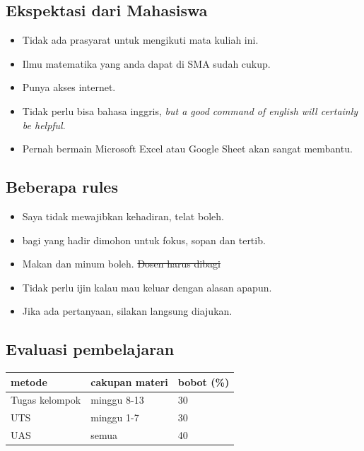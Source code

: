 \documentclass[
  letterpaper,
  DIV=11,
  numbers=noendperiod]{scrartcl}
\providecommand{\tightlist}{%
  \setlength{\itemsep}{0pt}\setlength{\parskip}{0pt}}\usepackage{longtable,booktabs,array}
\begin{document}
\hypertarget{ekspektasi-dari-mahasiswa}{%
\subsection{Ekspektasi dari Mahasiswa}\label{ekspektasi-dari-mahasiswa}}

\begin{itemize}
\tightlist
\item
  Tidak ada prasyarat untuk mengikuti mata kuliah ini.
\item
  Ilmu matematika yang anda dapat di SMA sudah cukup.
\item
  Punya akses internet.
\item
  Tidak perlu bisa bahasa inggris, \emph{but a good command of english
  will certainly be helpful}.
\item
  Pernah bermain Microsoft Excel atau Google Sheet akan sangat membantu.
\end{itemize}

\hypertarget{beberapa-rules}{%
\subsection{Beberapa rules}\label{beberapa-rules}}

\begin{itemize}
\tightlist
\item
  Saya tidak mewajibkan kehadiran, telat boleh.
\item
  bagi yang hadir dimohon untuk fokus, sopan dan tertib.
\item
  Makan dan minum boleh. \st{Dosen harus dibagi}
\item
  Tidak perlu ijin kalau mau keluar dengan alasan apapun.
\item
  Jika ada pertanyaan, silakan langsung diajukan.
\end{itemize}

\hypertarget{evaluasi-pembelajaran}{%
\subsection{Evaluasi pembelajaran}\label{evaluasi-pembelajaran}}

\begin{longtable}[]{@{}lll@{}}
\toprule\noalign{}
metode & cakupan materi & bobot (\%) \\
\midrule\noalign{}
\endhead
\bottomrule\noalign{}
\endlastfoot
Tugas kelompok & minggu 8-13 & 30 \\
UTS & minggu 1-7 & 30 \\
UAS & semua & 40 \\
\end{longtable}
\end{document}
